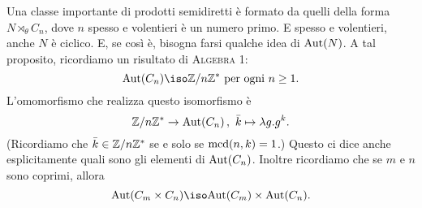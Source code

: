 \begin{rich}
Una classe importante di prodotti semidiretti è formato da quelli della forma $N \rtimes_\theta C_n$, dove $n$ spesso e volentieri è un numero primo. E spesso e volentieri, anche $N$ è ciclico. E, se così è, bisogna farsi qualche idea di $\mathrm{Aut}(N)$. A tal proposito, ricordiamo un risultato di {\scshape Algebra 1}:
\[\Aut(C_n) \iso \Z/n\Z^* \text{ per ogni } n \ge 1 .\]
L'omomorfismo che realizza questo isomorfismo è
\[\mathbb{Z}/n\mathbb{Z}^* \to \mathrm{Aut}(C_n) \,,\ \bar k \mapsto \lambda g. g^k .\]
(Ricordiamo che $\bar k \in \mathbb{Z}/n\mathbb{Z}^*$ se e solo se $\operatorname{mcd}(n, k) = 1$.) Questo ci dice anche esplicitamente quali sono gli elementi di $\mathrm{Aut}(C_n)$.
Inoltre ricordiamo che se $m$ e $n$ sono coprimi, allora
\[\Aut(C_m \times C_n) \iso \Aut(C_m) \times \Aut(C_n) .\]
\end{rich}


